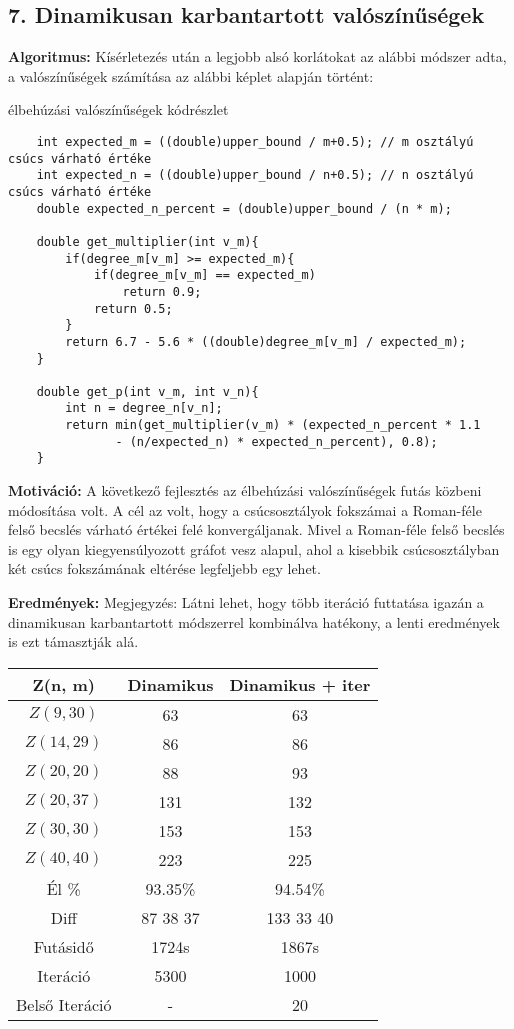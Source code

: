 \documentclass[12pt,a4paper]{article}
\begin{document}
\subsection*{7. Dinamikusan karbantartott valószínűségek}
\textbf{Algoritmus:} Kísérletezés után a legjobb alsó korlátokat az alábbi módszer adta, a valószínűségek számítása az alábbi
képlet alapján történt:
\begin{algorithm}[H]
\caption{élbehúzási valószínűségek kódrészlet}
\begin{verbatim} 
    int expected_m = ((double)upper_bound / m+0.5); // m osztályú csúcs várható értéke
    int expected_n = ((double)upper_bound / n+0.5); // n osztályú csúcs várható értéke
    double expected_n_percent = (double)upper_bound / (n * m);
    
    double get_multiplier(int v_m){
        if(degree_m[v_m] >= expected_m){
            if(degree_m[v_m] == expected_m)
                return 0.9;
            return 0.5;
        }
        return 6.7 - 5.6 * ((double)degree_m[v_m] / expected_m);
    }

    double get_p(int v_m, int v_n){
        int n = degree_n[v_n];
        return min(get_multiplier(v_m) * (expected_n_percent * 1.1
               - (n/expected_n) * expected_n_percent), 0.8);
    }
\end{verbatim}    
\end{algorithm}
\textbf{Motiváció:} A következő fejlesztés az élbehúzási valószínűségek futás közbeni módosítása volt. A cél az volt, hogy a csúcsosztályok fokszámai a Roman-féle felső becslés várható értékei felé konvergáljanak. Mivel a Roman-féle felső becslés is egy olyan kiegyensúlyozott gráfot vesz alapul, ahol a kisebbik csúcsosztályban két csúcs fokszámának eltérése legfeljebb egy lehet.

\textbf{Eredmények:}
Megjegyzés: Látni lehet, hogy több iteráció futtatása igazán a dinamikusan karbantartott módszerrel kombinálva hatékony, a lenti eredmények is ezt támasztják alá.
\begin{table}[H]
\centering
\begin{tabular}{|c|c|c|}
\hline
\textbf{Z(n, m)} & \textbf{Dinamikus} & \textbf{Dinamikus + iter} \\
\hline
$Z(9,30)$  & 63 & 63 \\
$Z(14, 29)$ & 86 & 86 \\
$Z(20, 20)$ & 88 & 93 \\
$Z(20, 37)$ & 131 & 132 \\
$Z(30, 30)$ & 153 & 153 \\
$Z(40, 40)$ & 223 & 225 \\
\hline
Él \% & 93.35\% & 94.54\% \\
\hline
Diff & 87 38 37 & 133 33 40 \\
\hline
Futásidő & 1724s & 1867s \\
Iteráció & 5300 & 1000 \\
Belső Iteráció & - & 20 \\
\hline
\end{tabular}
\end{table}
\end{document}
